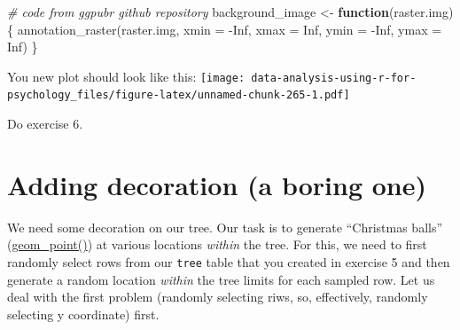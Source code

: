 \documentclass[
]{book}
\newenvironment{Shaded}{\begin{snugshade}}{\end{snugshade}}
\newcommand{\AttributeTok}[1]{\textcolor[rgb]{0.77,0.63,0.00}{#1}}
\newcommand{\CommentTok}[1]{\textcolor[rgb]{0.56,0.35,0.01}{\textit{#1}}}
\newcommand{\ConstantTok}[1]{\textcolor[rgb]{0.00,0.00,0.00}{#1}}
\newcommand{\ControlFlowTok}[1]{\textcolor[rgb]{0.13,0.29,0.53}{\textbf{#1}}}
\newcommand{\FunctionTok}[1]{\textcolor[rgb]{0.00,0.00,0.00}{#1}}
\newcommand{\NormalTok}[1]{#1}
\newcommand{\OtherTok}[1]{\textcolor[rgb]{0.56,0.35,0.01}{#1}}
\newcommand{\SpecialCharTok}[1]{\textcolor[rgb]{0.00,0.00,0.00}{#1}}
\begin{document}
\begin{Shaded}
\begin{Highlighting}[]
\CommentTok{\# code from ggpubr github repository}
\NormalTok{background\_image }\OtherTok{\textless{}{-}} \ControlFlowTok{function}\NormalTok{(raster.img)\{}
  \FunctionTok{annotation\_raster}\NormalTok{(raster.img,}
                    \AttributeTok{xmin =} \SpecialCharTok{{-}}\ConstantTok{Inf}\NormalTok{, }\AttributeTok{xmax =} \ConstantTok{Inf}\NormalTok{,}
                    \AttributeTok{ymin =} \SpecialCharTok{{-}}\ConstantTok{Inf}\NormalTok{, }\AttributeTok{ymax =} \ConstantTok{Inf}\NormalTok{)}
\NormalTok{\}}
\end{Highlighting}
\end{Shaded}

You new plot should look like this:
\texttt{[image: data-analysis-using-r-for-psychology\_files/figure-latex/unnamed-chunk-265-1.pdf]}

Do exercise 6.

\hypertarget{adding-decoration-a-boring-one}{%
\section{Adding decoration (a boring one)}\label{adding-decoration-a-boring-one}}

We need some decoration on our tree. Our task is to generate ``Christmas balls'' (\href{https://ggplot2.tidyverse.org/reference/geom_point.html}{geom\_point()}) at various locations \emph{within} the tree. For this, we need to first randomly select rows from our \texttt{tree} table that you created in exercise 5 and then generate a random location \emph{within} the tree limits for each sampled row. Let us deal with the first problem (randomly selecting riws, so, effectively, randomly selecting y coordinate) first.
\end{document}
